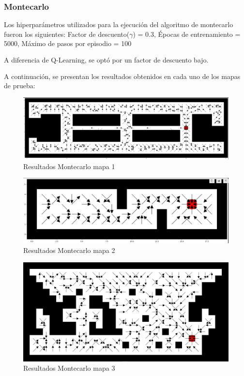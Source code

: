 \documentclass[conference,a4paper]{IEEEtran}
\begin{document}
\subsubsection{\textbf{Montecarlo}}

Los hiperparámetros utilizados para la ejecución del algoritmo de montecarlo fueron los siguientes:
Factor de descuento($\gamma$) = 0.3, Épocas de entrenamiento = 5000, Máximo de pasos por episodio = 100\newline

A diferencia de Q-Learning, se optó por un factor de descuento  bajo.\newline

A continuación, se presentan los resultados obtenidos en cada uno de los mapas de prueba:\newline

\begin{figure}[h]
  \centering
  \includegraphics[scale=0.2]{report/Montecarlo.png}
  \caption{Resultados Montecarlo mapa 1}
  \label{fig:Montecarlo}
\end{figure}

\begin{figure}[h]
  \centering
  \includegraphics[scale=0.2]{report/Montecarlo2.png}
  \caption{Resultados Montecarlo mapa 2}
  \label{fig:Montecarlo2}
\end{figure}

\begin{figure}[h]
  \centering
  \includegraphics[scale=0.2]{report/Montecarlo3.png}
  \caption{Resultados Montecarlo mapa 3}
  \label{fig:Montecarlo3}
\end{figure}
\end{document}
